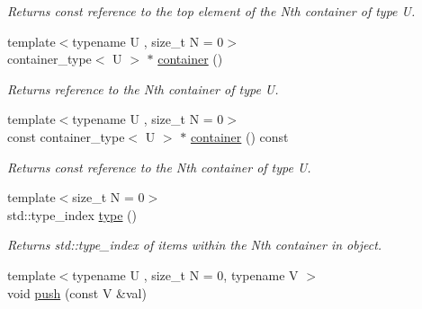 \begin{DoxyCompactItemize}
\begin{DoxyCompactList}\small\item\em Returns const reference to the top element of the Nth container of type U. \end{DoxyCompactList}\item 
\hypertarget{classheterogeneous_1_1heterostack_3_01_t_00_01_types_8_8_8_4_a73c49a017ef4fe0583dc0045683ab301}{}{\footnotesize template$<$typename U , size\+\_\+t N = 0$>$ }\\container\+\_\+type$<$ U $>$ $\ast$ \hyperlink{classheterogeneous_1_1heterostack_3_01_t_00_01_types_8_8_8_4_a73c49a017ef4fe0583dc0045683ab301}{container} ()\label{classheterogeneous_1_1heterostack_3_01_t_00_01_types_8_8_8_4_a73c49a017ef4fe0583dc0045683ab301}

\begin{DoxyCompactList}\small\item\em Returns reference to the Nth container of type U. \end{DoxyCompactList}\item 
\hypertarget{classheterogeneous_1_1heterostack_3_01_t_00_01_types_8_8_8_4_acf56c7566f593f090957b5f0a6875dbc}{}{\footnotesize template$<$typename U , size\+\_\+t N = 0$>$ }\\const container\+\_\+type$<$ U $>$ $\ast$ \hyperlink{classheterogeneous_1_1heterostack_3_01_t_00_01_types_8_8_8_4_acf56c7566f593f090957b5f0a6875dbc}{container} () const \label{classheterogeneous_1_1heterostack_3_01_t_00_01_types_8_8_8_4_acf56c7566f593f090957b5f0a6875dbc}

\begin{DoxyCompactList}\small\item\em Returns const reference to the Nth container of type U. \end{DoxyCompactList}\item 
\hypertarget{classheterogeneous_1_1heterostack_3_01_t_00_01_types_8_8_8_4_a4c2e4e6f6cd1436cd19b30c3fd669cd9}{}{\footnotesize template$<$size\+\_\+t N = 0$>$ }\\std\+::type\+\_\+index \hyperlink{classheterogeneous_1_1heterostack_3_01_t_00_01_types_8_8_8_4_a4c2e4e6f6cd1436cd19b30c3fd669cd9}{type} ()\label{classheterogeneous_1_1heterostack_3_01_t_00_01_types_8_8_8_4_a4c2e4e6f6cd1436cd19b30c3fd669cd9}

\begin{DoxyCompactList}\small\item\em Returns std\+::type\+\_\+index of items within the Nth container in object. \end{DoxyCompactList}\item 
\hypertarget{classheterogeneous_1_1heterostack_3_01_t_00_01_types_8_8_8_4_aa3b582a1acd93ff8978ff7ed091383c7}{}{\footnotesize template$<$typename U , size\+\_\+t N = 0, typename V $>$ }\\void \hyperlink{classheterogeneous_1_1heterostack_3_01_t_00_01_types_8_8_8_4_aa3b582a1acd93ff8978ff7ed091383c7}{push} (const V \&val)\label{classheterogeneous_1_1heterostack_3_01_t_00_01_types_8_8_8_4_aa3b582a1acd93ff8978ff7ed091383c7}


\end{DoxyCompactItemize}
